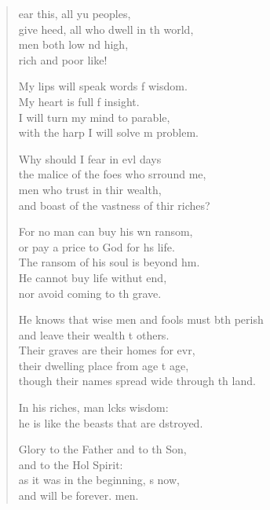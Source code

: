 \settowidth{\versewidth}{He knows that wise men and fools must both perish *}
\begin{verse}%
  \begin{patverse}
ear this, all yu peoples,\Med\\
give heed, all who dwell in th world,\\
men both low nd high,\Med\\
rich and poor like!

My lips will speak words f wisdom.\Med\\
My heart is full f insight.\\
I will turn my mind to  parable,\Med\\
with the harp I will solve m problem.

Why should I fear in ev\pointup{\i}l days\Med\\
the malice of the foes who srround me,\\
men who trust in thir wealth,\Med\\
and boast of the vastness of thir riches?

For no man can buy his wn ransom,\Med\\
or pay a price to God for h\pointup{\i}s life.\\
The ransom of his soul is beyond h\pointup{\i}m.\Flex\\
He cannot buy life withut end,\Med\\
nor avoid coming to th grave.

He knows that wise men and fools must bth perish\Med\\
and leave their wealth t others.\\
Their graves are their homes for evr,\Flex\\
their dwelling place from age t age,\Med\\
though their names spread wide through th land.

In his riches, man lcks wisdom:\Med\\
he is like the beasts that are dstroyed.

Glory to the Father and to th Son,\Med\\
and to the Hol Spirit:\\
as it was in the beginning, \pointup{\i}s now,\Med\\
and will be forever. men. 
  \end{patverse}
\end{verse}

